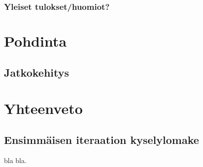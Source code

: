 \documentclass[utf8]{gradu3}
\begin{document}
\subsection{Yleiset tulokset/huomiot?}

%

\chapter{Pohdinta}

\section{}
\section{}
\section{Jatkokehitys}

%

\chapter{Yhteenveto}

\printbibliography

\appendix
\section{Ensimmäisen iteraation kyselylomake}

bla bla.
\end{document}
